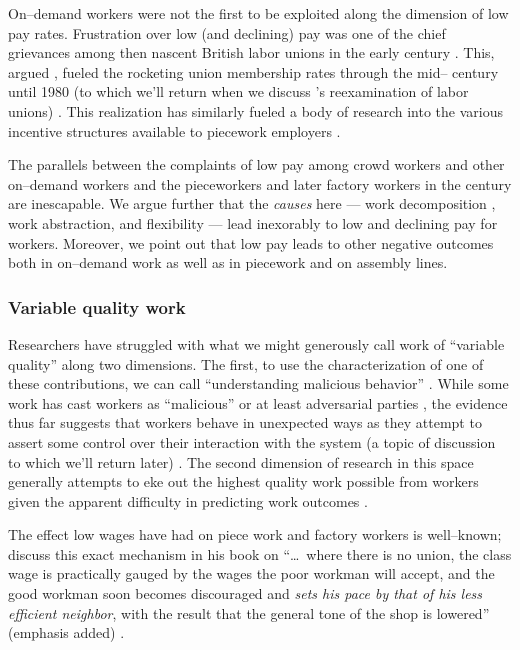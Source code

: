 \documentclass[trackingWork]{subfiles}
\begin{document}
{    On--demand workers were not the first to be exploited along the dimension of low pay rates.
    Frustration over low (and declining) pay was one of the chief grievances among then nascent
    British labor unions in the early  century
    \cite{turner1952trade}.
    This, \citeauthor{ebbinghaus1999institutions} argued%
,     fueled the rocketing union membership rates through the mid-- century until 1980
    (to which we'll return when we discuss \citeauthor{levi2009union}'s reexamination of labor unions)
    \cite{ebbinghaus1999institutions,levi2009union}.
    This realization has similarly fueled a body of research into
    the various incentive structures available to piecework employers
    \cite{roy1953work}.


    The parallels between the complaints of low pay among crowd workers and other on--demand workers
    and the pieceworkers and later factory workers in the  century
    are inescapable.
    We argue further that the \textit{causes} here
    --- work decomposition%
,     work abstraction, and
    flexibility ---
    lead inexorably to low and declining pay for workers.
    Moreover, we point out that low pay leads to other negative outcomes both
    in on--demand work
    as well as
    in piecework and on assembly lines.

    \subsubsection{Variable quality work}
    Researchers have struggled with what we might generously call work of ``variable quality''
    along two dimensions.
    The first, to use the characterization of one of these contributions, we can call
    ``understanding malicious behavior''
    \cite{MaliciousCrowdworkersGadiraju}.
    While some work has cast workers as ``malicious'' or at least adversarial parties%
,     the evidence thus far suggests that
    workers behave in unexpected ways as they attempt to assert some control over their interaction with the system
    (a topic of discussion to which we'll return later)
    \cite{uberAlgorithm}.
    The second dimension of research in this space generally attempts
    to eke out the highest quality work possible from workers
    given the apparent difficulty in predicting work outcomes
    \cite{embracingErrorKrishna}.



    The effect low wages have had on piece work and factory workers is well--known;
    \citeauthor{gantt1913work} discuss this exact mechanism in his book on
    ``\dots~where there is no union,
         the class wage is practically gauged by the wages the poor workman will accept,
         and the good workman soon becomes discouraged and \textit{sets his pace by that of his less efficient neighbor},
         with the result that the general tone of the shop is lowered'' (emphasis added)
    \cite{gantt1913work}.

}
\end{document}
